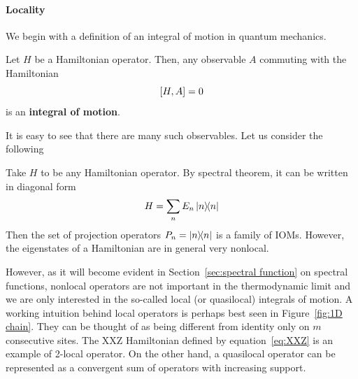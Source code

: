 \paragraph{Locality} We begin with a definition of an integral of motion in quantum mechanics.
\begin{definition}
  Let \(H\) be a Hamiltonian operator. Then, any observable \(A\) commuting with the Hamiltonian
  \begin{equation*}
    \comm{H}{A} = 0
  \end{equation*}
  is an \textbf{integral of motion}.\label{def:iom}
\end{definition}
It is easy to see that there are many such observables. Let us consider the following
\begin{example}
  Take \(H\) to be any Hamiltonian operator. By spectral theorem, it can be written in diagonal form
  \begin{equation*}
    H = \sum_n E_n \ketbra{n}{n}
  \end{equation*}
  Then the set of projection operators \(P_n = \ketbra{n}{n}\) is a family of IOMs.
  However, the eigenstates of a Hamiltonian are in general very nonlocal.\label{ex: projectors}
\end{example}
However, as it will become evident in Section~\ref{sec:spectral function} on spectral functions, nonlocal operators are not important in the
thermodynamic limit and we are only interested in the so-called local (or quasilocal) integrals of motion.
A working intuition behind local operators is perhaps best seen in Figure~\ref{fig:1D chain}. They can be thought of as
being different from identity only on \(m\) consecutive sites. The XXZ Hamiltonian defined by equation~\eqref{eq:XXZ} is an
example of 2-local operator. On the other hand, a quasilocal operator can be represented as a convergent sum of operators
with increasing support.
